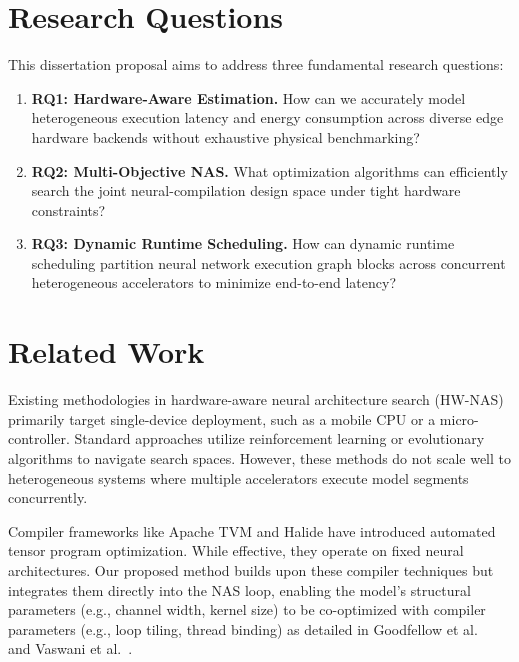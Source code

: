 \documentclass[11pt,a4paper]{article}
\begin{document}
\section{Research Questions}
This dissertation proposal aims to address three fundamental research questions:
\begin{enumerate}
    \item \textbf{RQ1: Hardware-Aware Estimation.} How can we accurately model heterogeneous execution latency and energy consumption across diverse edge hardware backends without exhaustive physical benchmarking?
    \item \textbf{RQ2: Multi-Objective NAS.} What optimization algorithms can efficiently search the joint neural-compilation design space under tight hardware constraints?
    \item \textbf{RQ3: Dynamic Runtime Scheduling.} How can dynamic runtime scheduling partition neural network execution graph blocks across concurrent heterogeneous accelerators to minimize end-to-end latency?
\end{enumerate}

\section{Related Work}
Existing methodologies in hardware-aware neural architecture search (HW-NAS) primarily target single-device deployment, such as a mobile CPU or a micro-controller. Standard approaches utilize reinforcement learning or evolutionary algorithms to navigate search spaces. However, these methods do not scale well to heterogeneous systems where multiple accelerators execute model segments concurrently.

Compiler frameworks like Apache TVM and Halide have introduced automated tensor program optimization. While effective, they operate on fixed neural architectures. Our proposed method builds upon these compiler techniques but integrates them directly into the NAS loop, enabling the model's structural parameters (e.g., channel width, kernel size) to be co-optimized with compiler parameters (e.g., loop tiling, thread binding) as detailed in Goodfellow et al.~\cite{goodfellow2016deep} and Vaswani et al.~\cite{vaswani2017attention}.
\end{document}
